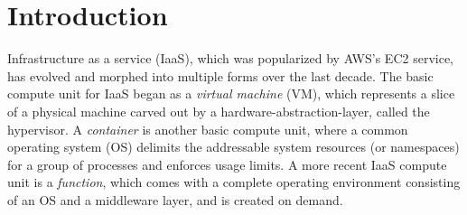 \section{Introduction}


Infrastructure as a service (IaaS), which was popularized by AWS's EC2 service, has evolved and morphed into multiple forms over the last decade.
The basic compute unit for IaaS began as a {\em virtual machine} (VM), which represents a slice of a physical machine carved out by a hardware-abstraction-layer, called the hypervisor.
A {\em container} is another basic compute unit, where a common operating system (OS) delimits the addressable system resources (or namespaces) for a group of processes and enforces usage limits.
A more recent IaaS compute unit is a {\em function}, which comes with a complete operating environment consisting of an OS and a middleware layer, and is created on demand.  

